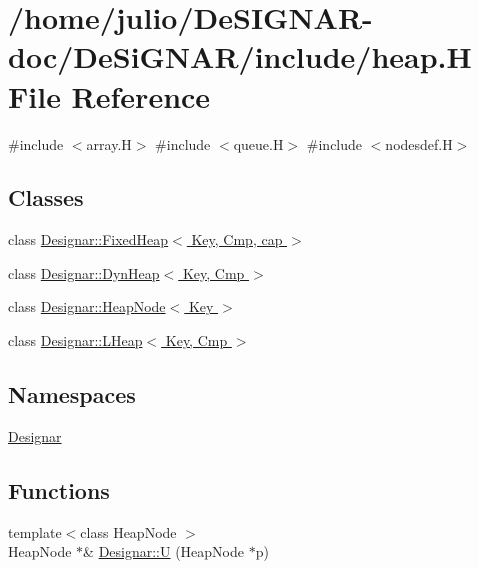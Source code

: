 \hypertarget{heap_8_h}{}\section{/home/julio/\+De\+S\+I\+G\+N\+A\+R-\/doc/\+De\+Si\+G\+N\+A\+R/include/heap.H File Reference}
\label{heap_8_h}
{\ttfamily \#include $<$array.\+H$>$}\newline
{\ttfamily \#include $<$queue.\+H$>$}\newline
{\ttfamily \#include $<$nodesdef.\+H$>$}\newline
\subsection*{Classes}
\begin{DoxyCompactItemize}
\item 
class \hyperlink{class_designar_1_1_fixed_heap}{Designar\+::\+Fixed\+Heap$<$ Key, Cmp, cap $>$}
\item 
class \hyperlink{class_designar_1_1_dyn_heap}{Designar\+::\+Dyn\+Heap$<$ Key, Cmp $>$}
\item 
class \hyperlink{class_designar_1_1_heap_node}{Designar\+::\+Heap\+Node$<$ Key $>$}
\item 
class \hyperlink{class_designar_1_1_l_heap}{Designar\+::\+L\+Heap$<$ Key, Cmp $>$}
\end{DoxyCompactItemize}
\subsection*{Namespaces}
\begin{DoxyCompactItemize}
\item 
 \hyperlink{namespace_designar}{Designar}
\end{DoxyCompactItemize}
\subsection*{Functions}
\begin{DoxyCompactItemize}
\item 
{\footnotesize template$<$class Heap\+Node $>$ }\\Heap\+Node $\ast$\& \hyperlink{namespace_designar_a67f4b8d103125d6c93110f43f4446187}{Designar\+::U} (Heap\+Node $\ast$p)
\end{DoxyCompactItemize}
